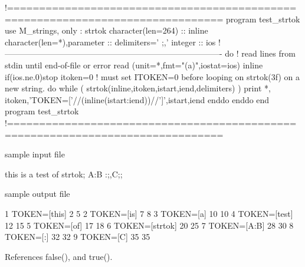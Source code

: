 \begin{DoxyVerb} !===============================================================================
 program test_strtok
 use M_strings, only : strtok
 character(len=264)          :: inline
 character(len=*),parameter  :: delimiters=' ;,'
 integer                     :: ios
 !-------------------------------------------------------------------------------
    do                        ! read lines from stdin until end-of-file or error
       read (unit=*,fmt="(a)",iostat=ios) inline
       if(ios.ne.0)stop
       itoken=0 ! must set ITOKEN=0 before looping on strtok(3f) on a new string.
       do while ( strtok(inline,itoken,istart,iend,delimiters) )
          print *, itoken,'TOKEN=['//(inline(istart:iend))//']',istart,iend
       enddo
    enddo
 end program test_strtok
 !===============================================================================

 sample input file

  this is a test of strtok; A:B :;,C;;

 sample output file

 1  TOKEN=[this]    2   5
 2  TOKEN=[is]      7   8
 3  TOKEN=[a]       10  10
 4  TOKEN=[test]    12  15
 5  TOKEN=[of]      17  18
 6  TOKEN=[strtok]  20  25
 7  TOKEN=[A:B]     28  30
 8  TOKEN=[:]       32  32
 9  TOKEN=[C]       35  35 \end{DoxyVerb}
 

References false(), and true().

\mbox{\label{namespacem__strings_ab84a4b7c2be211433c2d1b435a87fa32}} 

